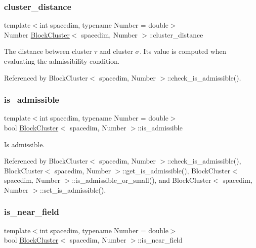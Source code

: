 \subsubsection{\texorpdfstring{cluster\+\_\+distance}{cluster\_distance}}
{\footnotesize\ttfamily template$<$int spacedim, typename Number = double$>$ \\
Number \hyperlink{classBlockCluster}{Block\+Cluster}$<$ spacedim, Number $>$\+::cluster\+\_\+distance\hspace{0.3cm}{\ttfamily [private]}}

The distance between cluster $\tau$ and cluster $\sigma$. Its value is computed when evaluating the admissibility condition. 

Referenced by Block\+Cluster$<$ spacedim, Number $>$\+::check\+\_\+is\+\_\+admissible().

\mbox{\label{classBlockCluster_ae85d165894d10b7e58fbe20edd506abe}} 
\subsubsection{\texorpdfstring{is\+\_\+admissible}{is\_admissible}}
{\footnotesize\ttfamily template$<$int spacedim, typename Number = double$>$ \\
bool \hyperlink{classBlockCluster}{Block\+Cluster}$<$ spacedim, Number $>$\+::is\+\_\+admissible\hspace{0.3cm}{\ttfamily [private]}}

Is admissible. 

Referenced by Block\+Cluster$<$ spacedim, Number $>$\+::check\+\_\+is\+\_\+admissible(), Block\+Cluster$<$ spacedim, Number $>$\+::get\+\_\+is\+\_\+admissible(), Block\+Cluster$<$ spacedim, Number $>$\+::is\+\_\+admissible\+\_\+or\+\_\+small(), and Block\+Cluster$<$ spacedim, Number $>$\+::set\+\_\+is\+\_\+admissible().

\mbox{\label{classBlockCluster_a6f719cbd6a646328f8128355c857745a}} 
\subsubsection{\texorpdfstring{is\+\_\+near\+\_\+field}{is\_near\_field}}
{\footnotesize\ttfamily template$<$int spacedim, typename Number = double$>$ \\
bool \hyperlink{classBlockCluster}{Block\+Cluster}$<$ spacedim, Number $>$\+::is\+\_\+near\+\_\+field\hspace{0.3cm}{\ttfamily [private]}}

